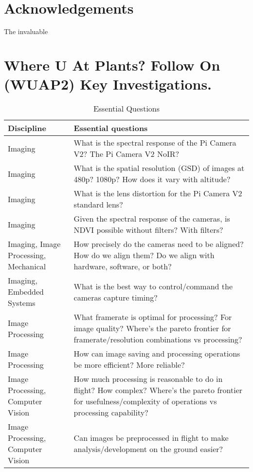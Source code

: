 \documentclass[conference]{IEEEtran} %
\begin{document}
\section*{Acknowledgements}
The invaluable




\onecolumn
\appendices{}


\section{Where U At Plants? Follow On (WUAP2) Key Investigations.}
\noindent
\begin{table}[h!]
  \label{essentialquestions}
  \caption{Essential Questions}
  \centering
\begin{tabularx}{\linewidth}{@{}p{}X@{}}
    \textbf{Discipline} & \textbf{Essential questions} \\
    \midrule
    Imaging & What is the spectral response of the Pi Camera V2? The Pi Camera V2 NoIR? \\
    Imaging & What is the spatial resolution (GSD) of images at 480p? 1080p? How does it vary with altitude? \\
    Imaging & What is the lens distortion for the Pi Camera V2 standard lens? \\
    Imaging & Given the spectral response of the cameras, is NDVI possible without filters? With filters? \\
    Imaging, Image Processing, Mechanical & How precisely do the cameras need to be aligned? How do we align them? Do we align with hardware, software, or both? \\
    Imaging, Embedded Systems & What is the best way to control/command the cameras capture timing? \\
    Image Processing & What framerate is optimal for processing? For image quality? Where's the pareto frontier for framerate/resolution combinations vs processing? \\
    Image Processing & How can image saving and processing operations be more efficient? More reliable? \\
    Image Processing, Computer Vision & How much processing is reasonable to do in flight? How complex? Where's the pareto frontier for usefulness/complexity of operations vs processing capability? \\
    Image Processing, Computer Vision & Can images be preprocessed in flight to make analysis/development on the ground easier? \\

\end{tabularx}
\end{table}
\end{document}
